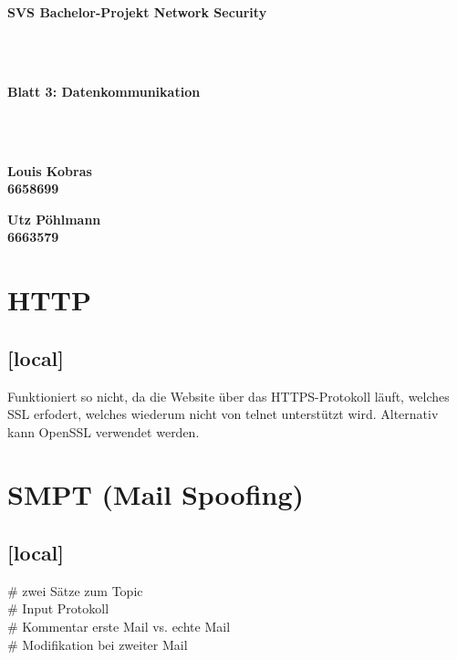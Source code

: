 \documentclass[twoside]{article}
\begin{document}
\pagestyle{fancy}
\fancyhead{}
\fancyfoot{}

\begin{center}
\begin{Huge}
\textbf{SVS Bachelor-Projekt Network Security}
\end{Huge}\\\-\\
\begin{Large}
\textbf{Blatt 3: Datenkommunikation}
\end{Large}\\\-\\
\begin{minipage}[t]{0.48\textwidth}
\begin{center}\textbf{
	Louis Kobras\\
	6658699}
\end{center}
\end{minipage}
\begin{minipage}[t]{0.48\textwidth}
\begin{center}\textbf{
	Utz Pöhlmann\\
	6663579}
\end{center}
\end{minipage}
\end{center}

\section{HTTP}
\subsection{[local]}
Funktioniert so nicht, da die Website über das HTTPS-Protokoll läuft, welches SSL erfodert, welches wiederum nicht von telnet unterstützt wird.
Alternativ kann OpenSSL verwendet werden.



\section{SMPT (Mail Spoofing)}
\subsection{[local]}
\# zwei Sätze zum Topic\\
\# Input Protokoll\\
\# Kommentar erste Mail vs. echte Mail\\
\# Modifikation bei zweiter Mail
\end{document}
